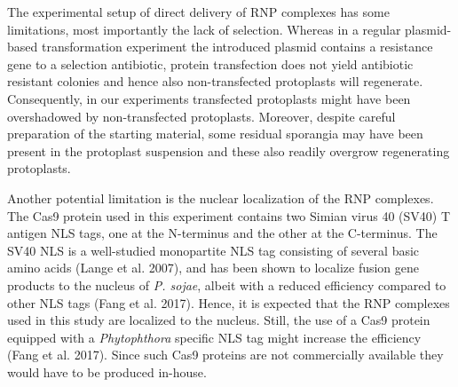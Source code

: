 \documentclass[onecolumn, 11pt,openany]{memoir}
\begin{document}
\begin{multicols}{2}
The experimental setup of direct delivery of RNP complexes has some limitations, most importantly the lack of selection. Whereas in a regular plasmid-based transformation experiment the introduced plasmid contains a resistance gene to a selection antibiotic, protein transfection does not yield antibiotic resistant colonies and hence also non-transfected protoplasts will regenerate. Consequently, in our experiments transfected protoplasts might have been overshadowed by non-transfected protoplasts. Moreover, despite careful preparation of the starting material, some residual sporangia may have been present in the protoplast suspension and these also readily overgrow regenerating protoplasts.

Another potential limitation is the nuclear localization of the RNP complexes. The Cas9 protein used in this experiment contains two Simian virus 40 (SV40) T antigen NLS tags, one at the N-terminus and the other at the C-terminus. The SV40 NLS is a well-studied monopartite NLS tag consisting of several basic amino acids (Lange et al. 2007), and has been shown to localize fusion gene products to the nucleus of \textit{P. sojae}, albeit with a reduced efficiency compared to other NLS tags (Fang et al. 2017). Hence, it is expected that the RNP complexes used in this study are localized to the nucleus. Still, the use of a Cas9 protein equipped with a \textit{Phytophthora} specific NLS tag might increase the efficiency (Fang et al. 2017). Since such Cas9 proteins are not commercially available they would have to be produced in-house.


\end{multicols}
\end{document}

